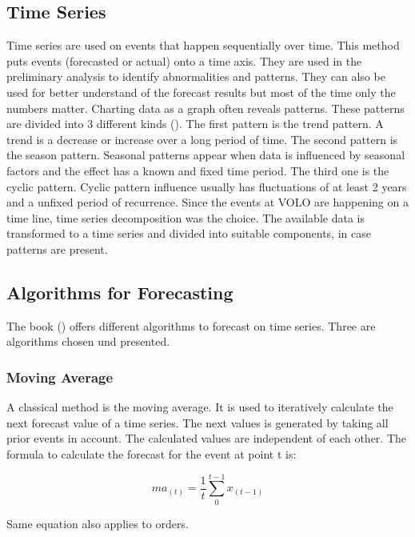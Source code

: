\subsection{Time Series}\label{subsection:Time Series}
Time series are used on events that happen sequentially over time. This method puts events (forecasted or actual) onto a time axis.
They are used in the preliminary analysis to identify abnormalities and patterns. They can also be used for better understand of the forecast results but most of the time only the numbers matter. Charting data as a graph often reveals patterns. These patterns are divided into 3 different kinds (\cite{Hyndman.2013}). The first pattern is the trend pattern. A trend is a decrease or increase over a long period of time. The second pattern is the season pattern. Seasonal patterns appear when data is influenced by seasonal factors and the effect has a known and fixed time period. The third one is the cyclic pattern. Cyclic pattern influence usually has fluctuations of at least 2 years and a unfixed period of recurrence.\newline
Since the events at VOLO are happening on a time line, time series decomposition was the choice. The available data is transformed to a time series and divided into suitable components, in case patterns are present.
\subsection{Algorithms for Forecasting}\label{subsection:Algorithms for Forecasting}
The book (\cite{Hyndman.2013}) offers different algorithms to forecast on time series. Three are algorithms chosen und presented.
\subsubsection{Moving Average}\label{subsubsection:Moving Average}
A classical method is the moving average. It is used to iteratively calculate the next forecast value of a time series. The next values is generated by taking all prior events in account. The calculated values are independent of each other. The formula to calculate the forecast for the event at point t is:
\begin{center}
\begin{equation}
ma_{(t)}= \frac{1}{t}\sum^{t-1}_0 x_{(t-1)}
\end{equation}
\end{center}
Same equation also applies to orders.


